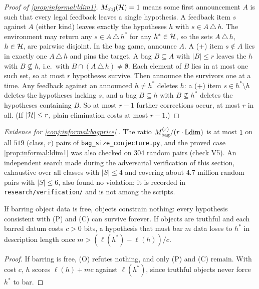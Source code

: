 \begin{proof}[Proof of \cref{prop:informal:ldim1}]
$M_{\mathrm{obj}}(\mathcal{H})=1$ means some first announcement $A$ is such that every legal feedback leaves a single hypothesis. A feedback item $s$ against $A$ (either kind) leaves exactly the hypotheses $h$ with $s\in A\,\triangle\,h$. The environment may return any $s\in A\,\triangle\,h^*$ for any $h^*\in\mathcal{H}$, so the sets $A\,\triangle\,h$, $h\in\mathcal{H}$, are pairwise disjoint. In the bag game, announce $A$. A (+) item $s\notin A$ lies in exactly one $A\,\triangle\,h$ and pins the target. A bag $B\subseteq A$ with $|B|\le r$ leaves the $h$ with $B\not\subseteq h$, i.e.\ with $B\cap(A\,\triangle\,h)\ne\emptyset$. Each element of $B$ lies in at most one such set, so at most $r$ hypotheses survive. Then announce the survivors one at a time. Any feedback against an announced $h\ne h^*$ deletes $h$: a (+) item $s\in h^*\setminus h$ deletes the hypotheses lacking $s$, and a bag $B\subseteq h$ with $B\not\subseteq h^*$ deletes the hypotheses containing $B$. So at most $r-1$ further corrections occur, at most $r$ in all. (If $|\mathcal{H}|\le r$, plain elimination costs at most $r-1$.)
\end{proof}

\emph{Evidence for \cref{conj:informal:bagprice}} . The ratio $M^{(r)}_{\mathrm{bag}}/(r\cdot\mathrm{Ldim})$ is at most $1$ on all $519$ (class, $r$) pairs of \texttt{bag\_size\_conjecture.py}, and the proved case \cref{prop:informal:ldim1} was also checked on $304$ random pairs (check V5). An independent search made during the adversarial verification of this section, exhaustive over all classes with $|S|\le4$ and covering about $4.7$ million random pairs with $|S|\le6$, also found no violation; it is recorded in \texttt{research/verification/} and is not among the scripts.

\begin{proposition}\label{prop:informal:barring}
If barring object data is free, objects constrain nothing: every hypothesis consistent with (P) and (C) can survive forever. If objects are truthful and each barred datum costs $c>0$ bits, a hypothesis that must bar $m$ data loses to $h^*$ in description length once $m>(\ell(h^*)-\ell(h))/c$.
\end{proposition}

\begin{proof}
If barring is free, (O) refutes nothing, and only (P) and (C) remain. With cost $c$, $h$ scores $\ell(h)+mc$ against $\ell(h^*)$, since truthful objects never force $h^*$ to bar.
\end{proof}

